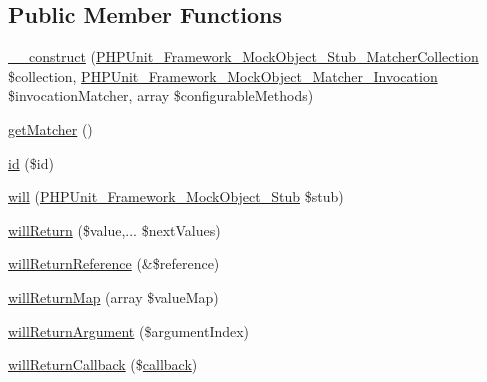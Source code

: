 \subsection*{Public Member Functions}
\begin{DoxyCompactItemize}
\item 
\mbox{\hyperlink{class_p_h_p_unit___framework___mock_object___builder___invocation_mocker_a08029838cf0fb2809c65c2834d7d75c4}{\+\_\+\+\_\+construct}} (\mbox{\hyperlink{interface_p_h_p_unit___framework___mock_object___stub___matcher_collection}{P\+H\+P\+Unit\+\_\+\+Framework\+\_\+\+Mock\+Object\+\_\+\+Stub\+\_\+\+Matcher\+Collection}} \$collection, \mbox{\hyperlink{interface_p_h_p_unit___framework___mock_object___matcher___invocation}{P\+H\+P\+Unit\+\_\+\+Framework\+\_\+\+Mock\+Object\+\_\+\+Matcher\+\_\+\+Invocation}} \$invocation\+Matcher, array \$configurable\+Methods)
\item 
\mbox{\hyperlink{class_p_h_p_unit___framework___mock_object___builder___invocation_mocker_aad4538bdde7e273b32661681773c32f0}{get\+Matcher}} ()
\item 
\mbox{\hyperlink{class_p_h_p_unit___framework___mock_object___builder___invocation_mocker_a6ff64f57bb98d1f8903290a95f22dc43}{id}} (\$id)
\item 
\mbox{\hyperlink{class_p_h_p_unit___framework___mock_object___builder___invocation_mocker_a0ca62ef89f1b4b06709f6db190ebbf58}{will}} (\mbox{\hyperlink{interface_p_h_p_unit___framework___mock_object___stub}{P\+H\+P\+Unit\+\_\+\+Framework\+\_\+\+Mock\+Object\+\_\+\+Stub}} \$stub)
\item 
\mbox{\hyperlink{class_p_h_p_unit___framework___mock_object___builder___invocation_mocker_a61f331332fec29cb49a0cccef4f39e7d}{will\+Return}} (\$value,... \$next\+Values)
\item 
\mbox{\hyperlink{class_p_h_p_unit___framework___mock_object___builder___invocation_mocker_a17b8cf7c55e59530772dd62ba29c085e}{will\+Return\+Reference}} (\&\$reference)
\item 
\mbox{\hyperlink{class_p_h_p_unit___framework___mock_object___builder___invocation_mocker_ab34703c589f8f81162ac0023eabb6a76}{will\+Return\+Map}} (array \$value\+Map)
\item 
\mbox{\hyperlink{class_p_h_p_unit___framework___mock_object___builder___invocation_mocker_a4965c881bb906913f472f854d3484e03}{will\+Return\+Argument}} (\$argument\+Index)
\item 
\mbox{\hyperlink{class_p_h_p_unit___framework___mock_object___builder___invocation_mocker_a5b34e9f5d935454303bb34f9e4cd955e}{will\+Return\+Callback}} (\$\mbox{\hyperlink{_functions_8php_ae2242eb47799ca6a822b022dc1bd1ac9}{callback}})

\end{DoxyCompactItemize}
